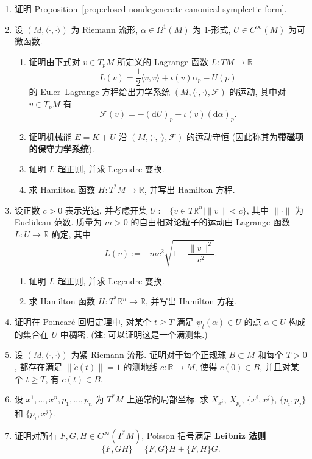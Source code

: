 \begin{RiemannExercise}\label{ex:hamiltonian-mechanics}
\begin{enumerate}[label=(\arabic*),ref=\arabic*,leftmargin=*]
\item\label{ex:verify-canonical-symplectic-form}
证明 Proposition~\ref{prop:closed-nondegenerate-canonical-symplectic-form}.
\item\label{ex:conservative-system-with-magnetic-term}
设 $(M,\langle\cdot,\cdot\rangle)$ 为 Riemann 流形, $\alpha\in\Omega^1(M)$ 为 1-形式, $U\in C^\infty(M)$ 为可微函数.
\begin{enumerate}[label=(\alph*),leftmargin=*]
\item 证明由下式对 $v\in T_pM$ 所定义的 Lagrange 函数 $L:TM\to\mathbb{R}$
\[
  L(v)=\frac{1}{2}\langle v,v\rangle+\iota(v)\alpha_p-U(p)
\]
的 Euler–Lagrange 方程给出力学系统 $(M,\langle\cdot,\cdot\rangle,\mathcal{F})$ 的运动, 其中对 $v\in T_pM$ 有
\[
  \mathcal{F}(v)=-(\mathrm{d}U)_p-\iota(v)(\mathrm{d}\alpha)_p.
\]
\item 证明机械能 $E=K+U$ 沿 $(M,\langle\cdot,\cdot\rangle,\mathcal{F})$ 的运动守恒 (因此称其为\textbf{带磁项的保守力学系统}).
\item 证明 $L$ 超正则, 并求 Legendre 变换.
\item 求 Hamilton 函数 $H:T^*M\to\mathbb{R}$, 并写出 Hamilton 方程.
\end{enumerate}
\item\label{ex:free-relativistic-particle-legendre-transform}
设正数 $c>0$ 表示光速, 并考虑开集 $U:=\{v\in T\mathbb{R}^n\mid\|v\|<c\}$, 其中 $\|\cdot\|$ 为 Euclidean 范数. 质量为 $m>0$ 的自由相对论粒子的运动由 Lagrange 函数 $L:U\to\mathbb{R}$ 确定, 其中
\[
  L(v):=-mc^2\sqrt{1-\frac{\|v\|^2}{c^2}}.
\]
\begin{enumerate}[label=(\alph*),leftmargin=*]
\item 证明 $L$ 超正则, 并求 Legendre 变换.
\item 求 Hamilton 函数 $H:T^*\mathbb{R}^n\to\mathbb{R}$, 并写出 Hamilton 方程.
\end{enumerate}
\item\label{ex:density-of-poincare-recurrent-points}
证明在 Poincaré 回归定理中, 对某个 $t\geq T$ 满足 $\psi_t(\alpha)\in U$ 的点 $\alpha\in U$ 构成的集合在 $U$ 中稠密. (\textbf{注}: 可以证明这是一个满测集.)
\item\label{ex:recurrence-of-unit-speed-geodesics}
设 $(M,\langle\cdot,\cdot\rangle)$ 为紧 Riemann 流形. 证明对于每个正规球 $B\subset M$ 和每个 $T>0$, 都存在满足 $\|\dot c(t)\|=1$ 的测地线 $c:\mathbb{R}\to M$, 使得 $c(0)\in B$, 并且对某个 $t\geq T$, 有 $c(t)\in B$.
\item\label{ex:hamiltonian-fields-of-canonical-coordinates}
设 $x^1,\ldots,x^n,p_1,\ldots,p_n$ 为 $T^*M$ 上通常的局部坐标. 求 $X_{x^i}$, $X_{p_i}$, $\{x^i,x^j\}$, $\{p_i,p_j\}$ 和 $\{p_i,x^j\}$.
\item\label{ex:leibniz-rule-for-poisson-bracket}
证明对所有 $F,G,H\in C^\infty(T^*M)$, Poisson 括号满足 \textbf{Leibniz 法则}
\[
  \{F,GH\}=\{F,G\}H+\{F,H\}G.
\]
\end{enumerate}
\end{RiemannExercise}
